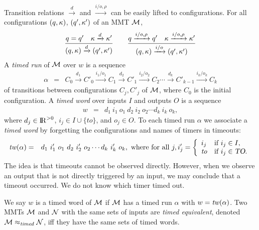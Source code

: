 Transition relations $\xrightarrow{d}$ and $\xrightarrow{i/o, \rho}$ can be easily lifted to configurations.
For all configurations $(q, \kappa)$, $(q', \kappa')$ of an MMT ${\cal M}$,
\[
\frac{q = q' \quad \kappa \xrightarrow{d} \kappa'}{(q,\kappa) \xrightarrow{d} (q',\kappa')}
\quad\quad
  \frac{q \xrightarrow{i/o,\rho} q' \quad \kappa \xrightarrow{i/o, \rho} \kappa'}{(q,\kappa) \xrightarrow{i/o} (q',\kappa')}
\]
A \emph{timed run} of ${\cal M}$ over $w$ is a sequence 
\begin{eqnarray*}
\alpha & = & C_0 \xrightarrow{d_1} C'_0 \xrightarrow{i_1/o_1} C_1 \xrightarrow{d_2} C'_1 \xrightarrow{i_2/o_2} C_2 \cdots
\xrightarrow{d_k} C'_{k-1} \xrightarrow{i_k/o_k} C_{k}
\end{eqnarray*}
of transitions between configurations $C_j, C'_j$ of ${\cal M}$, where $C_0$ is the initial configuration.
A \emph{timed word} over inputs $I$ and outputs $O$ is a sequence
\begin{eqnarray*}
w & = &  d_1 ~ i_1 ~ o_1 ~ d_2 ~ i_2 ~ o_2 \cdots d_k ~ i_k ~ o_k,
\end{eqnarray*}
where $d_j \in {\rm I\!R}^{> 0}$, $i_j \in I \cup \{ \mathit{to} \}$, and $o_j \in O$.
To each timed run $\alpha$ we associate a \emph{timed word} by forgetting the configurations and names of timers
in timeouts:
\begin{eqnarray*}
\mathit{tw}(\alpha) & = & d_1 ~ i'_1 ~ o_1 ~ d_2 ~ i'_2 ~ o_2 \cdots d_k ~ i'_k ~ o_k, \mbox{ where for all } j,
i'_j  =  \left\{ \begin{array}{ll}
i_j & \mbox{if } i_j \in I,\\
\mathit{to} & \mbox{if } i_j \in \mbox{\sl TO}.
\end{array} \right.
\end{eqnarray*}
The idea is that timeouts cannot be observed directly. 
However, when we observe an output that is not directly triggered by an input, we may
conclude that a timeout occurred. We do not know which timer timed out.

We say $w$ is a timed word of ${\cal M}$ if ${\cal M}$ has a timed run $\alpha$ with $w = \mathit{tw}(\alpha)$.
%
Two MMTs ${\cal M}$ and ${\cal N}$ with the same sets of inputs are \emph{timed equivalent}, denoted ${\cal M} \approx_{\mathit{timed}} {\cal N}$, iff 
they have the same sets of timed words.

